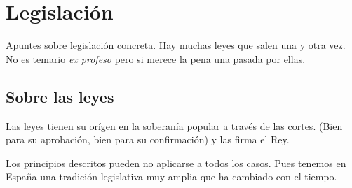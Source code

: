 \chapter{Legislación}
Apuntes sobre legislación concreta. Hay muchas leyes que salen una y otra vez. No es temario \textit{ex profeso} pero si merece la pena una pasada por ellas.

\section{Sobre las leyes}
Las leyes tienen su orígen en la soberanía popular a través de las cortes. (Bien para su aprobación, bien para su confirmación) y las firma el Rey.

Los principios descritos pueden no aplicarse a todos los casos. Pues tenemos en España una tradición legislativa muy amplia que ha cambiado con el tiempo.


